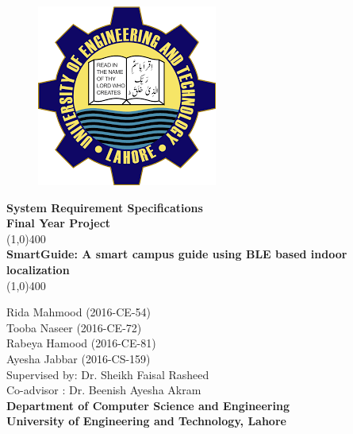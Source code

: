 \documentclass{article}
\begin{document}
\begin{titlepage}
\begin{center}
\vspace*{1cm}
\begin{figure}[h!]
\centering
\includegraphics[scale=0.5]{logo}
\end{figure}
\Large\textbf{System Requirement Specifications}\\
\Large\textbf{Final Year Project}\\
\vfill
\line(1,0){400}\\[1mm]
\huge{\textbf{SmartGuide: A smart campus guide using BLE based indoor localization}}\\[3mm]
\line(1,0){400}\\
\vfill

\large{Rida Mahmood  (2016-CE-54)}\\
\large{Tooba Naseer  (2016-CE-72)}\\
\large{Rabeya Hamood  (2016-CE-81)}\\
\large{Ayesha Jabbar  (2016-CS-159)}\\

\large{Supervised by: Dr. Sheikh Faisal Rasheed}\\
\large{Co-advisor : Dr. Beenish Ayesha Akram}\\
\large{\textbf{Department of Computer Science and Engineering}}\\
\large{\textbf{University of Engineering and Technology, Lahore}}\\
\end{center}
\end{titlepage}
\tableofcontents
\thispagestyle{empty}
\clearpage
\setcounter{page}{1}

\makeatletter
\newcommand{\heading}[1]%
{\par\vskip 1.5ex \@plus .2ex
 \hangindent=1em
 \noindent\makebox[1em][l]{$\,\bullet$}\textbf{\large #1}%
\par\vskip 1.5ex \@plus .2ex
\@afterheading}
\makeatother
\end{document}
